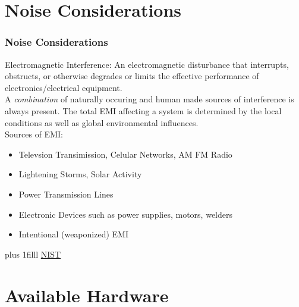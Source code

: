 \documentclass[fleqn]{beamer} %
\newcommand{\sectiontitleII}{Noise Considerations}
\newcommand{\sectiontitleIII}{Available Hardware}
\newcommand{\btVFill}{\vskip0pt plus 1filll}
\begin{document}
\section{\sectiontitleII}	

\begin{frame}[label=sectionII] \scriptsize
\frametitle{\sectiontitleII}
\bigskip

{\RD Electromagnetic Interference}:  An electromagnetic disturbance that interrupts, obstructs, or otherwise degrades or limits the effective performance of electronics/electrical equipment.\vspace{5mm}\\

A {\it combination} of naturally occuring and human made sources of interference is always present. The total EMI affecting a system is determined by the local conditions as well as global environmental influences. \vspace{5mm}\\


Sources of EMI:
\begin{itemize}

	\item Televsion Transimission, Celular Networks, AM FM Radio 
	\item Lightening Storms, Solar Activity 
	\item Power Transmission Lines	
	\item Electronic Devices such as power supplies, motors, welders
 
	\item Intentional (weaponized) EMI	

\end{itemize}


\btVFill
\tiny{\href{https://csrc.nist.gov/glossary/term/electromagnetic_interference}{NIST}}		

\end{frame}

\section{\sectiontitleIII}	
\end{document}
